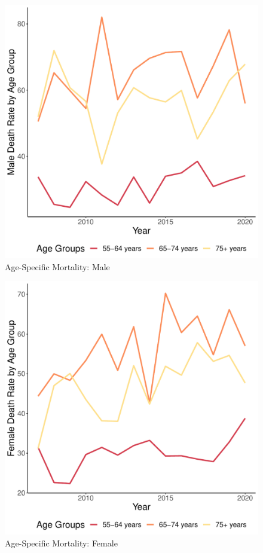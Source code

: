 \documentclass[12pt]{article}
\begin{document}
\newpage

\begin{figure}
    \centering
    \includegraphics[scale=0.5]{analysis/output/male_age_specific_deaths_plot.pdf}
    \caption{Age-Specific Mortality: Male}
    \label{fig:male_age_specific_deaths}
\end{figure}

\newpage

\begin{figure}
    \centering
    \includegraphics[scale=0.5]{analysis/output/female_age_specific_deaths_plot.pdf}
    \caption{Age-Specific Mortality: Female}
    \label{fig:female_age_specific_deaths}
\end{figure}
\end{document}
